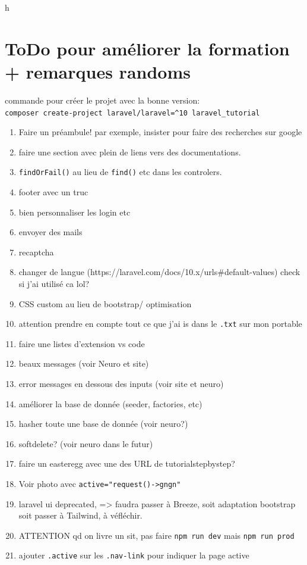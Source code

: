 \documentclass[internal]{nhitec_design}
\begin{document}
\newpage
h
\newpage

\section{ToDo pour améliorer la formation + remarques randoms}
commande pour créer le projet avec la bonne version: \\
\verb|composer create-project laravel/laravel=^10 laravel_tutorial|
\begin{enumerate}
    \item Faire un préambule! par exemple, insister pour faire des recherches sur google
    \item faire une section avec plein de liens vers des documentations.
    \item \verb|findOrFail()| au lieu de \verb|find()| etc dans les controlers.
    \item footer avec un truc
    \item bien personnaliser les login etc
    \item envoyer des mails
    \item recaptcha
    \item changer de langue (https://laravel.com/docs/10.x/urls\#default-values) check si j'ai utilisé ca lol?
    \item CSS custom au lieu de bootstrap/ optimisation
    \item attention  prendre en compte tout ce que j'ai is dans le \verb|.txt| sur mon portable
    \item faire une listes d'extension vs code
    \item beaux messages (voir Neuro et site)
    \item error messages en dessous des inputs (voir site et neuro)
    \item améliorer la base de donnée (seeder, factories, etc)
    \item hasher toute une base de donnée (voir neuro?)
    \item softdelete? (voir neuro dans le futur)
    \item faire un easteregg avec une des URL de tutorialstepbystep?
    \item Voir photo avec \verb|active="request()->gngn"|
    \item laravel ui deprecated, => faudra passer à Breeze, soit adaptation bootstrap soit passer à Tailwind, à véfléchir.
    \item ATTENTION qd on livre un sit, pas faire \verb|npm run dev| mais \verb|npm run prod|
    \item ajouter \verb|.active| sur les \verb|.nav-link| pour indiquer la page active
\end{enumerate}
\end{document}
